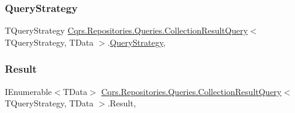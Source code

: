 \subsubsection{\texorpdfstring{Query\+Strategy}{QueryStrategy}}
{\footnotesize\ttfamily T\+Query\+Strategy \hyperlink{classCqrs_1_1Repositories_1_1Queries_1_1CollectionResultQuery}{Cqrs.\+Repositories.\+Queries.\+Collection\+Result\+Query}$<$ T\+Query\+Strategy, T\+Data $>$.\hyperlink{classCqrs_1_1Repositories_1_1Queries_1_1QueryStrategy}{Query\+Strategy}\hspace{0.3cm}{\ttfamily [get]}, {\ttfamily [set]}}

\mbox{\label{classCqrs_1_1Repositories_1_1Queries_1_1CollectionResultQuery_af2542c8b63668ddb39c2195c3280cd89}} 
\subsubsection{\texorpdfstring{Result}{Result}}
{\footnotesize\ttfamily I\+Enumerable$<$T\+Data$>$ \hyperlink{classCqrs_1_1Repositories_1_1Queries_1_1CollectionResultQuery}{Cqrs.\+Repositories.\+Queries.\+Collection\+Result\+Query}$<$ T\+Query\+Strategy, T\+Data $>$.Result\hspace{0.3cm}{\ttfamily [get]}, {\ttfamily [set]}}

